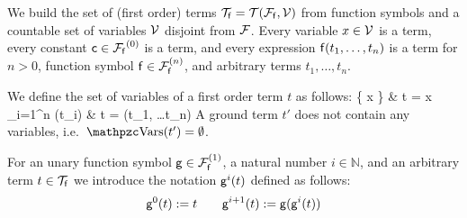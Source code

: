 
\begin{definition}\label{def:terms}
	We build the set of (first order) {\myem terms }$\mcTf = \mcTFfV$
	from function symbols and a
	countable set of {\myem variables }$\mcV$ disjoint from $\mcF$\!.
	Every variable $x\in\mcV$ is a term,
	every {\myem constant} $\mc\in\mcFf^{(0)}$ is a term,
	and every expression $\mf(t_1,\ldots,t_n)$ is a term
	for $n>0$, function symbol $\mf\in\mcFfn$,
	and arbitrary terms $t_1,\ldots,t_n$.
\end{definition}

\begin{definition}\label{def:term:vars}\label{def:term:ground}
	We define the set of variables of a first order term $t$ as follows:
	 {
		\{ x \} &  t = x \in \mcV \\
		\bigcup_{i=1}^n \var(t_i) &   t = \mf(t_1, \ldots t_n)
	}
	A {\myem ground} term $t'$ does not contain any variables, i.e.~$\var(t') = \emptyset$.
\end{definition}

\begin{definition}\label{def:unary:power}
	For an unary function symbol $\mg\in\mcFfn[1]$, a natural number
	$i\in\mathbb{N}$, and an arbitrary term $t\in\mcTf$ we introduce the notation $\mg^i(t)$ defined as follows:
	\[
	\mg^0(t) := t \qquad
	\mg^{i+1}(t) := \mg(\mg^i(t))
	\]
\end{definition}

